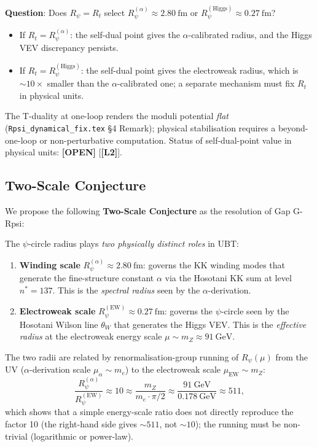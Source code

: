\documentclass[12pt]{article}
\theoremstyle{definition}
\theoremstyle{remark}
\newcommand{\Ltwo}{\textbf{[L2]}}
\newcommand{\OPEN}{\textbf{[OPEN]}}
\begin{document}
\textbf{Question}: Does $R_\psi = R_t$ select
$R_\psi^{(\alpha)} \approx 2.80~\text{fm}$ or
$R_\psi^{(\text{Higgs})} \approx 0.27~\text{fm}$?

\begin{itemize}
  \item If $R_t = R_\psi^{(\alpha)}$: the self-dual point gives the
        $\alpha$-calibrated radius, and the Higgs VEV discrepancy persists.
  \item If $R_t = R_\psi^{(\text{Higgs})}$: the self-dual point gives
        the electroweak radius, which is $\sim 10\times$ smaller than
        the $\alpha$-calibrated one; a separate mechanism must fix $R_t$
        in physical units.
\end{itemize}

The T-duality at one-loop renders the moduli potential \emph{flat}
(\texttt{Rpsi\_dynamical\_fix.tex} §4 Remark); physical stabilisation
requires a beyond-one-loop or non-perturbative computation.
Status of self-dual-point value in physical units: \OPEN{} [\Ltwo].

\subsection{Two-Scale Conjecture}

We propose the following \textbf{Two-Scale Conjecture} as the resolution
of Gap G-Rpsi:

\begin{conjecture}
\label{conj:two_scale}
The $\psi$-circle radius plays \emph{two physically distinct roles} in UBT:
\begin{enumerate}
  \item \textbf{Winding scale} $R_\psi^{(\alpha)} \approx 2.80~\text{fm}$:
        governs the KK winding modes that generate the fine-structure
        constant $\alpha$ via the Hosotani KK sum at level $n^* = 137$.
        This is the \emph{spectral radius} seen by the $\alpha$-derivation.
  \item \textbf{Electroweak scale} $R_\psi^{(\text{EW})} \approx 0.27~\text{fm}$:
        governs the $\psi$-circle seen by the Hosotani Wilson line
        $\theta_W$ that generates the Higgs VEV.
        This is the \emph{effective radius} at the electroweak energy scale
        $\mu \sim m_Z \approx 91~\text{GeV}$.
\end{enumerate}
The two radii are related by renormalisation-group running of $R_\psi(\mu)$
from the UV ($\alpha$-derivation scale $\mu_\alpha \sim m_e$) to the
electroweak scale $\mu_{\text{EW}} \sim m_Z$:
\begin{equation}
  \frac{R_\psi^{(\alpha)}}{R_\psi^{(\text{EW})}}
  \approx 10 \approx \frac{m_Z}{m_e \cdot \pi/2}
  \approx \frac{91~\text{GeV}}{0.178~\text{GeV}} \approx 511,
  \label{eq:Rpsi_running}
\end{equation}
which shows that a simple energy-scale ratio does not directly reproduce the
factor 10 (the right-hand side gives $\sim 511$, not $\sim 10$); the running must be non-trivial (logarithmic or power-law).
\end{conjecture}
\end{document}
